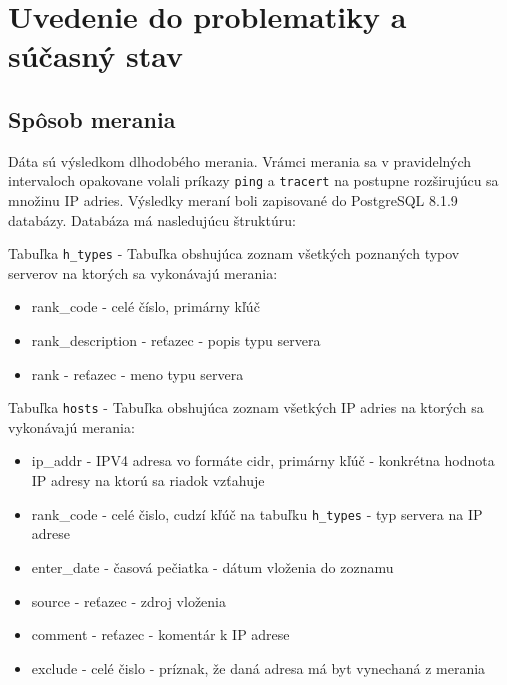 \chapter{Uvedenie do problematiky a súčasný stav}

\label{kap:uvod_teoria}

\section{Spôsob merania}
Dáta sú výsledkom dlhodobého merania. Vrámci merania sa v pravidelných intervaloch opakovane volali príkazy \lstinline{ping} a \lstinline{tracert} na postupne 
rozširujúcu sa množinu IP adries. Výsledky meraní boli zapisované do PostgreSQL 8.1.9 databázy. Databáza má nasledujúcu štruktúru:

Tabuľka \lstinline{h_types} - Tabuľka obshujúca zoznam všetkých poznaných typov serverov na ktorých sa vykonávajú merania:
\begin{itemize}
    \item rank\_code - celé číslo, primárny kľúč
    \item rank\_description - reťazec - popis typu servera
    \item rank - reťazec - meno typu servera
\end{itemize}

Tabuľka \lstinline{hosts} - Tabuľka obshujúca zoznam všetkých IP adries na ktorých sa vykonávajú merania:
\begin{itemize}
    \item ip\_addr - IPV4 adresa vo formáte cidr, primárny kľúč - konkrétna hodnota IP adresy na ktorú sa riadok vzťahuje
    \item rank\_code - celé čislo, cudzí kľúč na tabuľku \lstinline{h_types} - typ servera na IP adrese
    \item enter\_date - časová pečiatka - dátum vloženia do zoznamu 
    \item source - reťazec - zdroj vloženia 
    \item comment - reťazec - komentár k IP adrese
    \item exclude - celé čislo - príznak, že daná adresa má byt vynechaná z merania
\end{itemize}


